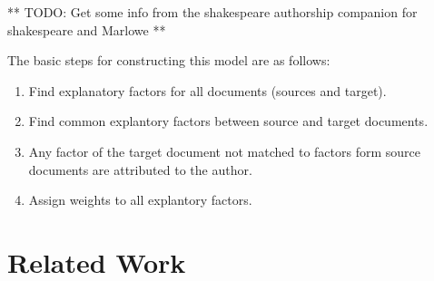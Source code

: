 \documentclass[../dissertation.tex]{subfiles}
\begin{document}
** TODO: Get some info from the shakespeare authorship companion for
shakespeare and Marlowe **

The basic steps for constructing this model are as follows:
\begin{enumerate}
    \item Find explanatory factors for all documents (sources and
        target).
    \item Find common explantory factors between source and target
        documents.  
    \item Any factor of the target document not matched to factors
        form source documents are attributed to the author.
    \item Assign weights to all explantory factors.
\end{enumerate}

\section{Related Work}
\end{document}
